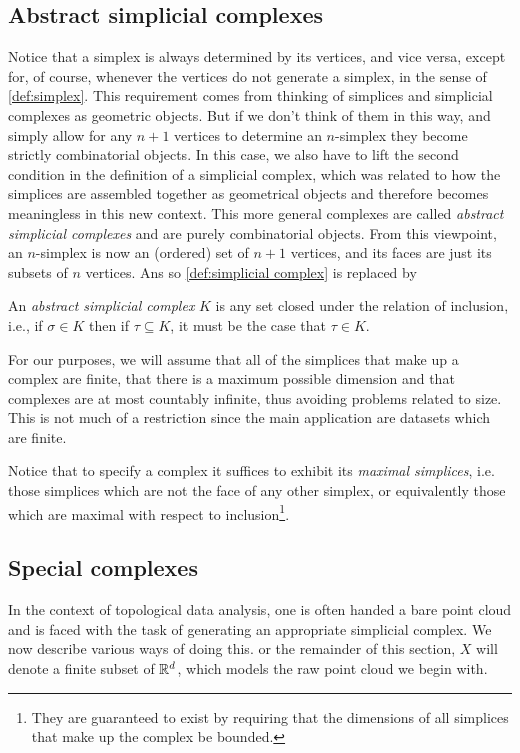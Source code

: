 \documentclass[../main.tex]{subfiles}
\begin{document}
\subsection{Abstract simplicial complexes}
Notice that a simplex is always determined by its vertices, and vice versa, except for, of
course, whenever the vertices do not generate a simplex, in the sense of
\cref{def:simplex}. This requirement comes from thinking of simplices and simplicial
complexes as geometric objects. But if we don't think of them in this way, and simply
allow for any \( n+1 \) vertices to determine an \( n \)-simplex they become strictly
combinatorial objects. In this case, we also have to lift the second condition in the
definition of a simplicial complex, which was related to how the simplices are assembled
together as geometrical objects and therefore becomes meaningless in this new context. This more
general complexes are called \emph{abstract simplicial complexes} and are purely
combinatorial objects. From this viewpoint, an \( n \)-simplex is now an (ordered) set of
\( n+1 \) vertices, and its faces are just its subsets of \( n \) vertices. 
Ans so \cref{def:simplicial complex} is replaced by
\begin{definition}
	An \emph{abstract simplicial complex} \( K \) is any set closed under the relation of
	inclusion, i.e., if \( \sigma \in K \) then if \( \tau \subseteq K \), it must be the
	case that \( \tau \in K \).  
\end{definition}
For our purposes, we will assume that all of the simplices that make up a complex are
finite, that there is a maximum possible dimension  and that complexes are at most
countably infinite, thus avoiding problems related to size. This is not much of a
restriction since the main application are datasets which are finite. 

Notice that to specify a complex it suffices to exhibit its \emph{maximal simplices}, i.e.
those simplices which are not the face of any other simplex, or equivalently those which
are maximal with respect to inclusion\footnote{They are guaranteed to exist by requiring that the
dimensions of all simplices that make up the complex be bounded.}.

\subsection{Special complexes}
In the context of topological data analysis, one is often handed a bare point cloud and is
faced with the task of generating an appropriate simplicial complex. We now describe
various ways of doing this.  or the remainder of this section, \( X \) will denote a
finite subset of \( \mathbb{R}^d \), which models the raw point cloud we begin with. 
\end{document}
